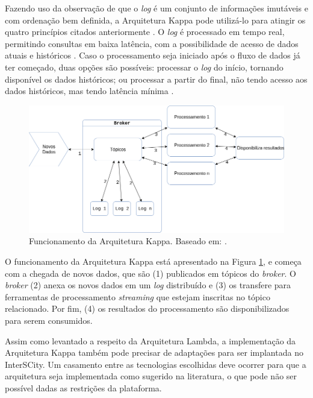 Fazendo uso da observação de que o \textit{log} é um conjunto de informações
imutáveis e com ordenação bem definida, a Arquitetura Kappa pode utilizá-lo
para atingir os quatro princípios citados anteriormente \cite{kreps2014}. O
\textit{log} é processado em tempo real, permitindo consultas em baixa
latência, com a possibilidade de acesso de dados atuais e históricos
\cite{forgeat2015}. Caso o processamento seja iniciado após o fluxo de dados já
ter começado, duas opções são possíveis: processar o \textit{log} do início,
tornando disponível os dados históricos; ou processar a partir do final,
não tendo acesso aos dados históricos, mas tendo latência mínima
\cite{kreps2014}.

\begin{figure}[hbt]
  \centering
    \includegraphics[scale=0.5]{figuras/kappa_architecture.png}
    \caption{Funcionamento da Arquitetura Kappa. Baseado em: .}
  \label{fig:kappa-lifecycle}
\end{figure}

O funcionamento da Arquitetura Kappa está apresentado na Figura
\ref{fig:kappa-lifecycle}, e começa com a chegada de novos dados,
que são (1) publicados em tópicos do \textit{broker}. O \textit{broker} (2) anexa
os novos dados em um \textit{log} distribuído e (3) os transfere para
ferramentas de processamento \textit{streaming} que estejam inscritas no tópico
relacionado. Por fim, (4) os resultados do processamento são disponibilizados
para serem consumidos.

Assim como levantado a respeito da Arquitetura Lambda, a implementação da
Arquitetura Kappa também pode precisar de adaptações para ser implantada no
InterSCity. Um casamento entre as tecnologias escolhidas deve ocorrer para que a
arquitetura seja implementada como sugerido na literatura, o que pode não ser
possível dadas as restrições da plataforma.

